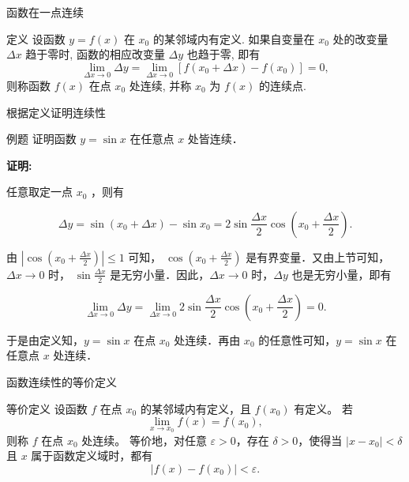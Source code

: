 \documentclass[aspectratio=169,10pt]{ctexbeamer}
\begin{document}
\begin{frame}{函数在一点连续}
	\large
	
	\begin{block}{定义}
		设函数 $y=f(x)$ 在 $x_0$ 的某邻域内有定义. 如果自变量在 $x_0$ 处的改变量 $\Delta x$ 趋于零时, 函数的相应改变量 $\Delta y$ 也趋于零, 即有
		$$ \lim\limits_{\Delta x \to 0} \Delta y = \lim\limits_{\Delta x \to 0} [f(x_0 + \Delta x) - f(x_0)] = 0, $$
		则称函数 $f(x)$ 在点 $x_0$ 处连续, 并称 $x_0$ 为 $f(x)$ 的连续点.
	\end{block}
	
	
	 
	
	
	
\end{frame}

\begin{frame}{根据定义证明连续性}
	
	\begin{block}{例题}
		证明函数 $y=\sin x$ 在任意点 $x$ 处皆连续．
	\end{block}
	
	\pause

	
	\textbf{证明:}
	
	任意取定一点 $x_0$ ，则有
	
	$$
	\Delta y=\sin \left(x_0+\Delta x\right)-\sin x_0=2 \sin \frac{\Delta x}{2} \cos \left(x_0+\frac{\Delta x}{2}\right) .
	$$
	
	
	由 $\left|\cos \left(x_0+\frac{\Delta x}{2}\right)\right| \leqslant 1$ 可知， $\cos \left(x_0+\frac{\Delta x}{2}\right)$ 是有界变量．又由上节可知，$\Delta x \rightarrow 0$ 时， $\sin \frac{\Delta x}{2}$ 是无穷小量．因此，$\Delta x \rightarrow 0$ 时，$\Delta y$ 也是无穷小量，即有
	
	$$
	\lim\limits _{\Delta x \rightarrow 0} \Delta y=\lim\limits _{\Delta x \rightarrow 0} 2 \sin \frac{\Delta x}{2} \cos \left(x_0+\frac{\Delta x}{2}\right)=0 .
	$$
	
	于是由定义知，$y=\sin x$ 在点 $x_0$ 处连续．再由 $x_0$ 的任意性可知，$y=\sin x$ 在任意点 $x$ 处连续．
	
\end{frame}

\begin{frame}{函数连续性的等价定义}
	\large
	\begin{block}{等价定义}
		设函数 $f$ 在点 $x_0$ 的某邻域内有定义，且 $f(x_0)$ 有定义。 若
		\[
		\lim\limits_{x\to x_0}f(x)=f(x_0),
		\]
		则称 $f$ 在点 $x_0$ 处连续。 等价地，对任意 $\varepsilon>0$，存在 $\delta>0$，使得当 $|x-x_0|<\delta$ 且 $x$ 属于函数定义域时，都有
		\[
		|f(x)-f(x_0)|<\varepsilon.
		\]
	\end{block}
\end{frame}
\end{document}

